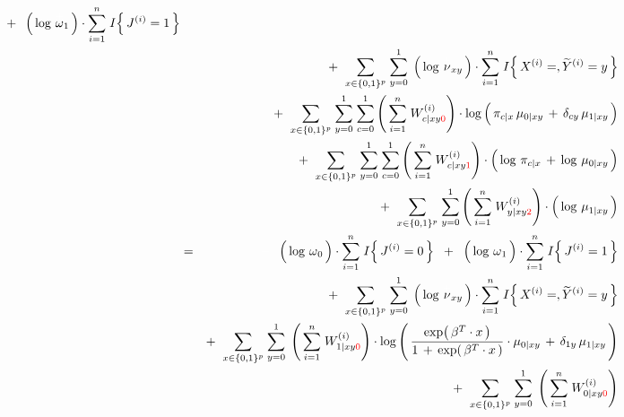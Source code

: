 \begin{enumerate}
\begin{eqnarray*}
	\;\; + \;\;
	\left(\,\log\,\overset{{\color{white}+}}{\omega}_{1}\,\right)\cdot\overset{n}{\underset{i=1}{\sum}}\; I\!\left\{\,J^{(i)}=1\,\right\}
\\
&&
	+ \;\;
	\underset{x\in\{0,1\}^{p}}{\sum}\;
	\overset{1}{\underset{y=0}{\sum}}\;
		\left(\,\log\,\overset{{\color{white}+}}{\nu}_{xy}\,\right)
		\cdot
		\overset{n}{\underset{i=1}{\sum}}\; I\!\left\{\,X^{(i)}=,\widetilde{Y}^{(i)}=y\,\right\}
\\
&&
	+ \;\;
	\underset{x\in\{0,1\}^{p}}{\sum}\;
	\overset{1}{\underset{y=0}{\sum}}\;
	\overset{1}{\underset{c=0}{\sum}}
	\left(\,\overset{n}{\underset{i=1}{\sum}}\;W^{(i)}_{c \vert xy{\color{red}0}}\right)
	\cdot
	\log\left(\,
		\pi_{c \vert x}\,\mu_{0 \vert xy}
		\,\overset{{\color{white}.}}{+}\,
		\delta_{cy}\,\mu_{1\vert xy}
		\,\right)
\\
&&
	+ \;\;
	\underset{x\in\{0,1\}^{p}}{\sum}\;
	\overset{1}{\underset{y=0}{\sum}}\;
	\overset{1}{\underset{c=0}{\sum}}
	\left(\,\overset{n}{\underset{i=1}{\sum}}\;W^{(i)}_{c \vert xy{\color{red}1}}\right)
	\cdot
	\left(\,
		\log\,\pi_{c \vert x}
		\,\overset{{\color{white}.}}{+}\,
		\log\,\mu_{0\vert xy}
	\,\right)
\\
&&
	+ \;\;
	\underset{x\in\{0,1\}^{p}}{\sum}\;
	\overset{1}{\underset{y=0}{\sum}}
	\left(\,\overset{n}{\underset{i=1}{\sum}}\;W^{(i)}_{y \vert xy{\color{red}2}}\right)
	\cdot
	\left(\,\log\,\overset{{\color{white}.}}{\mu}_{1 \vert xy}\,\right)
\\
&=&
	{\color{white}+} \;\;
	\left(\,\log\,\overset{{\color{white}+}}{\omega}_{0}\,\right)\cdot\overset{n}{\underset{i=1}{\sum}}\; I\!\left\{\,J^{(i)}=0\,\right\}
	\;\; + \;\;
	\left(\,\log\,\overset{{\color{white}+}}{\omega}_{1}\,\right)\cdot\overset{n}{\underset{i=1}{\sum}}\; I\!\left\{\,J^{(i)}=1\,\right\}
\\
&&
	+ \;\;
	\underset{x\in\{0,1\}^{p}}{\sum}\;
	\overset{1}{\underset{y=0}{\sum}}\;
		\left(\,\log\,\overset{{\color{white}+}}{\nu}_{xy}\,\right)
		\cdot
		\overset{n}{\underset{i=1}{\sum}}\; I\!\left\{\,X^{(i)}=,\widetilde{Y}^{(i)}=y\,\right\}
\\
&&
	+ \;\;
	\underset{x\in\{0,1\}^{p}}{\sum}\;
	\overset{1}{\underset{y=0}{\sum}}\;
	\left(\,\overset{n}{\underset{i=1}{\sum}}\;W^{(i)}_{1 \vert xy{\color{red}0}}\right)
	\cdot
	\log\left(\,
		\logisticBetaX
		\cdot
		\mu_{0 \vert xy}
		\,\overset{{\color{white}.}}{+}\,
		\delta_{1y}\,\mu_{1\vert xy}
		\,\right)
\\
&&
	+ \;\;
	\underset{x\in\{0,1\}^{p}}{\sum}\;
	\overset{1}{\underset{y=0}{\sum}}\;
	\left(\,\overset{n}{\underset{i=1}{\sum}}\;W^{(i)}_{0 \vert xy{\color{red}0}}\right)

\end{eqnarray*}
\end{enumerate}
